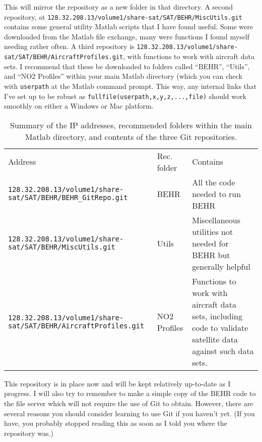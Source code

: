 \documentclass[12pt]{article}
\begin{document}
\vspace{12pt}
\noindent This will mirror the repository as a new folder in that directory.  A second repository, at {\lstinline[breaklines=true]|128.32.208.13/volume1/share-sat/SAT/BEHR/MiscUtils.git|} contains some general utility Matlab scripts that I have found useful.  Some were downloaded from the Matlab file exchange, many were functions I found myself needing rather often.  A third repository is {\lstinline[breaklines=true]|128.32.208.13/volume1/share-sat/SAT/BEHR/AircraftProfiles.git|}, with functions to work with aircraft data sets.  I recommend that these be downloaded to folders called ``BEHR'', ``Utils'', and ``NO2 Profiles'' within your main Matlab directory (which you can check with {\lstinline[breaklines=true]|userpath|} at the Matlab command prompt.  This way, any internal links that I've set up to be robust as {\lstinline[breaklines=true]|fullfile(userpath,x,y,z,...,file)|} should work smoothly on either a Windows or Mac platform.

\begin{table}[h]
\begin{tabu} to \textwidth{  X[3,l] | X[1,l] | X[2,l]  } 
	Address 		&	Rec. folder 			&	Contains \\ \tabucline[2pt]{-}
	{\lstinline[breaklines=true]|128.32.208.13/volume1/share-sat/SAT/BEHR/BEHR_GitRepo.git|} & BEHR & All the code needed to run BEHR \\ \hline
	{\lstinline[breaklines=true]|128.32.208.13/volume1/share-sat/SAT/BEHR/MiscUtils.git|} & Utils & Miscellaneous utilities not needed for BEHR but generally helpful \\ \hline
	{\lstinline[breaklines=true]|128.32.208.13/volume1/share-sat/SAT/BEHR/AircraftProfiles.git|} & NO2 Profiles & Functions to work with aircraft data sets, including code to validate satellite data against such data sets. 
\end{tabu}
	\caption{Summary of the IP addresses, recommended folders within the main Matlab directory, and contents of the three Git repositories.}
	\label{GitReposTable}
\end{table}

	This repository is in place now and will be kept relatively up-to-date as I progress.  I will also try to remember to make a simple copy of the BEHR code to the file server which will not require the use of Git to obtain.  However, there are several reasons you should consider learning to use Git if you haven't yet. (If you have, you probably stopped reading this as soon as I told you where the repository was.)
	
\end{document}
